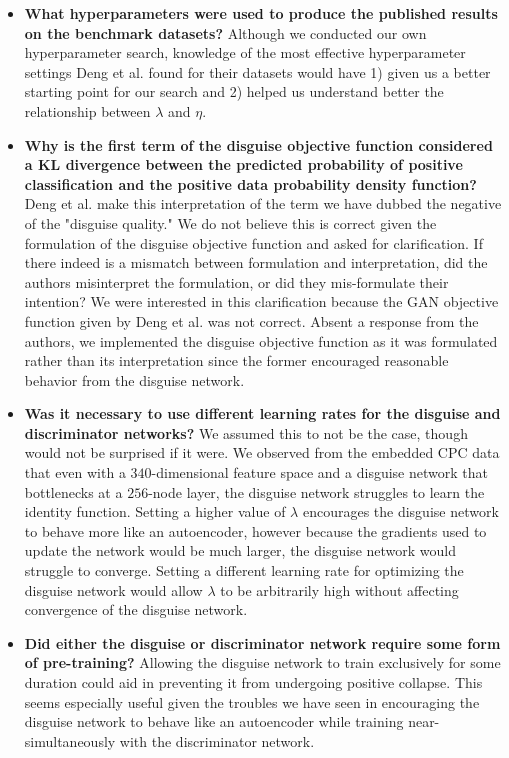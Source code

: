\documentclass{proc}
\begin{document}
\begin{itemize}
    \item{\textbf{What hyperparameters were used to produce the published results on the benchmark datasets?} Although we conducted our own hyperparameter search, knowledge of the most effective hyperparameter settings Deng et al. found for their datasets would have 1) given us a better starting point for our search and 2) helped us understand better the relationship between $\lambda$ and $\eta$.}
    \item{\textbf{Why is the first term of the disguise objective function considered a KL divergence between the predicted probability of positive classification and the positive data probability density function?}} Deng et al. make this interpretation of the term we have dubbed the negative of the "disguise quality." We do not believe this is correct given the formulation of the disguise objective function and asked for clarification. If there indeed is a mismatch between formulation and interpretation, did the authors misinterpret the formulation, or did they mis-formulate their intention? We were interested in this clarification because the GAN objective function given by Deng et al. was not correct. Absent a response from the authors, we implemented the disguise objective function as it was formulated rather than its interpretation since the former encouraged reasonable behavior from the disguise network.
    \item{\textbf{Was it necessary to use different learning rates for the disguise and discriminator networks?}} We assumed this to not be the case, though would not be surprised if it were. We observed from the embedded CPC data that even with a $340$-dimensional feature space and a disguise network that bottlenecks at a $256$-node layer, the disguise network struggles to learn the identity function. Setting a higher value of $\lambda$ encourages the disguise network to behave more like an autoencoder, however because the gradients used to update the network would be much larger, the disguise network would struggle to converge. Setting a different learning rate for optimizing the disguise network would allow $\lambda$ to be arbitrarily high without affecting convergence of the disguise network.
    \item{\textbf{Did either the disguise or discriminator network require some form of pre-training?}} Allowing the disguise network to train exclusively for some duration could aid in preventing it from undergoing positive collapse. This seems especially useful given the troubles we have seen in encouraging the disguise network to behave like an autoencoder while training near-simultaneously with the discriminator network.
\end{itemize}
\end{document}
